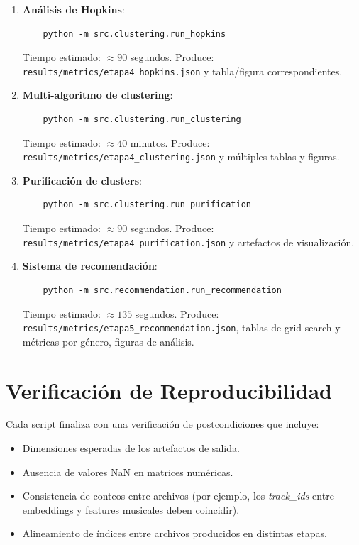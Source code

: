 \begin{enumerate}[leftmargin=2em]
    \item \textbf{Análisis de Hopkins}:
    \begin{verbatim}
    python -m src.clustering.run_hopkins
    \end{verbatim}
    Tiempo estimado: $\approx 90$ segundos. Produce: \texttt{results/metrics/etapa4\_hopkins.json} y tabla/figura correspondientes.

    \item \textbf{Multi-algoritmo de clustering}:
    \begin{verbatim}
    python -m src.clustering.run_clustering
    \end{verbatim}
    Tiempo estimado: $\approx 40$ minutos. Produce: \texttt{results/metrics/etapa4\_clustering.json} y múltiples tablas y figuras.

    \item \textbf{Purificación de clusters}:
    \begin{verbatim}
    python -m src.clustering.run_purification
    \end{verbatim}
    Tiempo estimado: $\approx 90$ segundos. Produce: \texttt{results/metrics/etapa4\_purification.json} y artefactos de visualización.

    \item \textbf{Sistema de recomendación}:
    \begin{verbatim}
    python -m src.recommendation.run_recommendation
    \end{verbatim}
    Tiempo estimado: $\approx 135$ segundos. Produce: \texttt{results/metrics/etapa5\_recommendation.json}, tablas de grid search y métricas por género, figuras de análisis.
\end{enumerate}

\section{Verificación de Reproducibilidad}

Cada script finaliza con una verificación de postcondiciones que incluye:
\begin{itemize}[leftmargin=2em]
    \item Dimensiones esperadas de los artefactos de salida.
    \item Ausencia de valores NaN en matrices numéricas.
    \item Consistencia de conteos entre archivos (por ejemplo, los \textit{track\_ids} entre embeddings y features musicales deben coincidir).
    \item Alineamiento de índices entre archivos producidos en distintas etapas.
\end{itemize}

